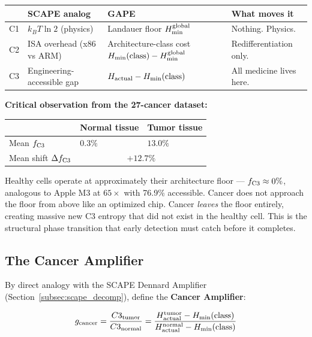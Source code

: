 \documentclass[12pt,a4paper]{article}
\begin{document}
\begin{center}
\renewcommand{\arraystretch}{1.25}
\begin{tabular}{p{1.3cm}p{3.2cm}p{3.2cm}p{4.0cm}}
\toprule
 & \textbf{SCAPE analog} & \textbf{GAPE} & \textbf{What moves it} \\
\midrule
C1 & $k_BT\ln 2$ (physics) & Landauer floor $H_{\rm min}^{\rm global}$ & Nothing. Physics. \\
C2 & ISA overhead (x86 vs ARM) & Architecture-class cost $H_{\rm min}(\text{class}) - H_{\rm min}^{\rm global}$ & Redifferentiation only. \\
C3 & Engineering-accessible gap & $H_{\rm actual} - H_{\rm min}(\text{class})$ & All medicine lives here. \\
\bottomrule
\end{tabular}
\end{center}

\noindent \textbf{Critical observation from the 27-cancer dataset:}

\begin{center}
\renewcommand{\arraystretch}{1.2}
\begin{tabular}{lll}
\toprule
 & \textbf{Normal tissue} & \textbf{Tumor tissue} \\
\midrule
Mean $f_{\rm C3}$ & $0.3\%$ & $13.0\%$ \\
Mean shift $\Delta f_{\rm C3}$ & \multicolumn{2}{c}{$+12.7\%$} \\
\bottomrule
\end{tabular}
\end{center}

\noindent Healthy cells operate at approximately their architecture floor ---
$f_{\rm C3} \approx 0\%$, analogous to Apple M3 at $65\times$ with 76.9\% accessible.
Cancer does not approach the floor from above like an optimized chip.
Cancer \emph{leaves} the floor entirely, creating massive new C3 entropy
that did not exist in the healthy cell.
This is the structural phase transition that early detection must catch
before it completes.

\subsection{The Cancer Amplifier}
\label{subsec:g_cancer}

By direct analogy with the SCAPE Dennard Amplifier (Section~\ref{subsec:scape_decomp}),
define the \textbf{Cancer Amplifier}:

\begin{equation}
g_{\rm cancer} = \frac{C3_{\rm tumor}}{C3_{\rm normal}}
= \frac{H_{\rm actual}^{\rm tumor} - H_{\rm min}(\text{class})}
       {H_{\rm actual}^{\rm normal} - H_{\rm min}(\text{class})}
\label{eq:g_cancer}
\end{equation}
\end{document}
